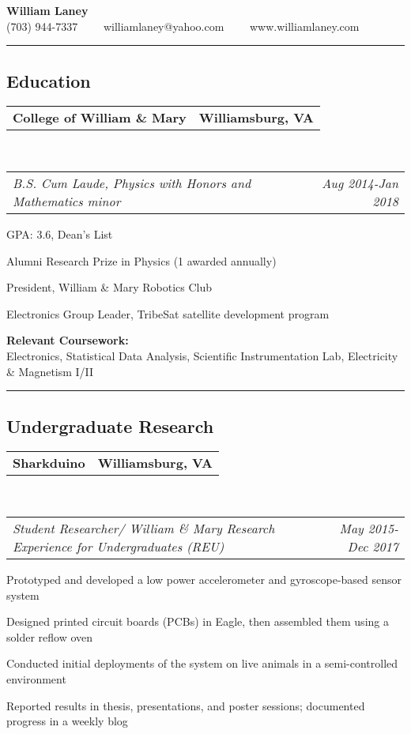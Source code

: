 \documentclass[10pt,letterpaper]{article}
\makeatletter
\newcommand{\headerrow}[2]
{\begin{tabular*}{\linewidth}{l@{\extracolsep{\fill}}r}
	#1 &
	#2 \\
\end{tabular*}}
\makeatother
\begin{document}
\begin{center}
{\LARGE \textbf{William Laney}}\\
\vspace{0.1em}
(703) 944-7337\ \ \textbullet
\ \ williamlaney@yahoo.com\ \ \textbullet
\ \ www.williamlaney.com
\end{center}

\hrule
\vspace{-0.4em}
\subsection*{Education}

	\headerrow
		{\textbf{College of William \& Mary}}
		{\textbf{Williamsburg, VA}}
	\\
	\headerrow
		{\emph{B.S. Cum Laude, Physics with Honors and Mathematics minor}}
		{\emph{Aug 2014-Jan 2018}}
	\begin{itemize*}
		\item GPA: 3.6, Dean's List
		\item Alumni Research Prize in Physics (1 awarded annually)
		\item President, William \& Mary Robotics Club
		\item Electronics Group Leader, TribeSat satellite development program
		\item \textbf{Relevant Coursework:} \\
		Electronics, Statistical Data Analysis, Scientific Instrumentation Lab, Electricity \& Magnetism I/II
	\end{itemize*}

\hrule
\vspace{-0.4em}
\subsection*{Undergraduate Research}

	\headerrow
		{\textbf{Sharkduino}}
		{\textbf{Williamsburg, VA}}
	\\
	\headerrow
		{\emph{Student Researcher/ William \& Mary Research Experience for Undergraduates (REU)}}
		{\emph{May 2015-Dec 2017}}
	\begin{itemize*}
	\item Prototyped and developed a low power accelerometer and gyroscope-based sensor system
	\item Designed printed circuit boards (PCBs) in Eagle, then assembled them using a solder reflow oven
	\item Conducted initial deployments of the system on live animals in a semi-controlled environment
	\item Reported results in thesis, presentations, and poster sessions; documented progress in a weekly blog
	\end{itemize*}
	
\end{document}
